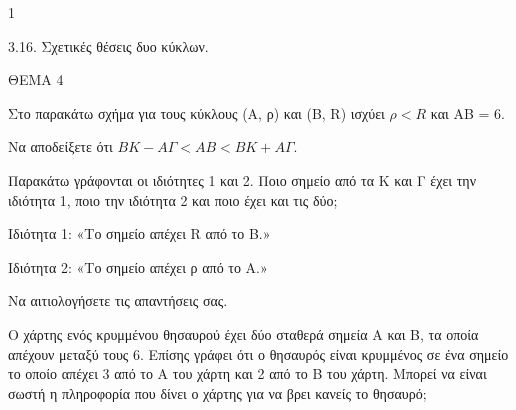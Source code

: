 \begin{ylh}{1}
    \item 3.16. Σχετικές θέσεις δυο κύκλων.
\end{ylh}

ΘΕΜΑ 4

\begin{alist}
\item Στο παρακάτω σχήμα για τους κύκλους (Α, ρ) και (Β, R) ισχύει $\rho < R$ και ΑΒ = 6.



\begin{rlist}
\item Να αποδείξετε ότι $ΒK - Α\Gamma < ΑΒ < ΒK + Α\Gamma$.

\item Παρακάτω γράφονται οι ιδιότητες 1 και 2. Ποιο σημείο από τα Κ και Γ έχει την ιδιότητα 1, ποιο την ιδιότητα 2 και ποιο έχει και τις δύο;

Ιδιότητα 1: «Το σημείο απέχει R από το Β.»

Ιδιότητα 2: «Το σημείο απέχει ρ από το Α.»

Να αιτιολογήσετε τις απαντήσεις σας.


\end{rlist}
\item Ο χάρτης ενός κρυμμένου θησαυρού έχει δύο σταθερά σημεία Α και Β, τα οποία απέχουν μεταξύ τους 6. Επίσης γράφει ότι ο θησαυρός είναι κρυμμένος σε ένα σημείο το οποίο απέχει 3 από το Α του χάρτη και 2 από το Β του χάρτη. Μπορεί να είναι σωστή η πληροφορία που δίνει ο χάρτης για να βρει κανείς το θησαυρό;

\end{alist}
